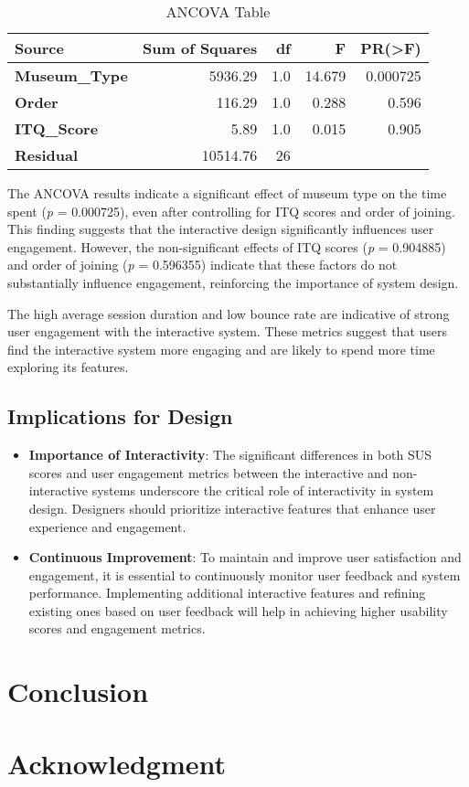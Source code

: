 \documentclass[conference]{IEEEtran}
\begin{document}
\begin{table}[h]
    \centering
    \begin{tabular}{|l|r|r|r|r|}
    \hline
    \textbf{Source}      & \textbf{Sum of Squares} & \textbf{df} & \textbf{F}   & \textbf{PR(>F)} \\ \hline
    \textbf{Museum\_Type} & 5936.29                & 1.0         & 14.679       & 0.000725        \\ \hline
    \textbf{Order}       & 116.29                 & 1.0         & 0.288        & 0.596           \\ \hline
    \textbf{ITQ\_Score}  & 5.89                   & 1.0         & 0.015        & 0.905           \\ \hline
    \textbf{Residual}    & 10514.76               & 26          &              &                 \\ \hline
    \end{tabular}
    \caption{ANCOVA Table}
\end{table}

The ANCOVA results indicate a significant effect of museum type on the time spent (\textit{p} = 0.000725), even after controlling for ITQ scores and order of joining. This finding suggests that the interactive design significantly influences user engagement. However, the non-significant effects of ITQ scores (\textit{p} = 0.904885) and order of joining (\textit{p} = 0.596355) indicate that these factors do not substantially influence engagement, reinforcing the importance of system design.

The high average session duration and low bounce rate are indicative of strong user engagement with the interactive system. These metrics suggest that users find the interactive system more engaging and are likely to spend more time exploring its features.

\subsection{Implications for Design}
\begin{itemize}
    \item \textbf{Importance of Interactivity}: The significant differences in both SUS scores and user engagement metrics between the interactive and non-interactive systems underscore the critical role of interactivity in system design. Designers should prioritize interactive features that enhance user experience and engagement.
    \item \textbf{Continuous Improvement}: To maintain and improve user satisfaction and engagement, it is essential to continuously monitor user feedback and system performance. Implementing additional interactive features and refining existing ones based on user feedback will help in achieving higher usability scores and engagement metrics.
\end{itemize}

\section{Conclusion}

\section*{Acknowledgment}



\end{document}
